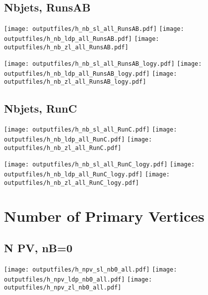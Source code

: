 \documentclass[11pt]{article}
\begin{document}

    \subsection{ Nbjets, RunsAB}

    \noindent
     \texttt{[image: outputfiles/h\_nb\_sl\_all\_RunsAB.pdf]}
     \texttt{[image: outputfiles/h\_nb\_ldp\_all\_RunsAB.pdf]}
     \texttt{[image: outputfiles/h\_nb\_zl\_all\_RunsAB.pdf]}

    \noindent
     \texttt{[image: outputfiles/h\_nb\_sl\_all\_RunsAB\_logy.pdf]}
     \texttt{[image: outputfiles/h\_nb\_ldp\_all\_RunsAB\_logy.pdf]}
     \texttt{[image: outputfiles/h\_nb\_zl\_all\_RunsAB\_logy.pdf]}


    \subsection{ Nbjets, RunC}

    \noindent
     \texttt{[image: outputfiles/h\_nb\_sl\_all\_RunC.pdf]}
     \texttt{[image: outputfiles/h\_nb\_ldp\_all\_RunC.pdf]}
     \texttt{[image: outputfiles/h\_nb\_zl\_all\_RunC.pdf]}

    \noindent
     \texttt{[image: outputfiles/h\_nb\_sl\_all\_RunC\_logy.pdf]}
     \texttt{[image: outputfiles/h\_nb\_ldp\_all\_RunC\_logy.pdf]}
     \texttt{[image: outputfiles/h\_nb\_zl\_all\_RunC\_logy.pdf]}






    \section{Number of Primary Vertices }

    \subsection{ N PV, nB=0 }

    \noindent
     \texttt{[image: outputfiles/h\_npv\_sl\_nb0\_all.pdf]}
     \texttt{[image: outputfiles/h\_npv\_ldp\_nb0\_all.pdf]}
     \texttt{[image: outputfiles/h\_npv\_zl\_nb0\_all.pdf]}
\end{document}
